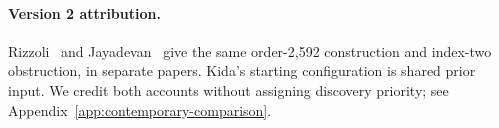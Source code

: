 
\paragraph{Version 2 attribution.}
Rizzoli~\cite{rizzoli-21-68} and Jayadevan~\cite{jayadevan-21-68}
give the same order-2,592 construction and index-two obstruction, in
separate papers. Kida's starting configuration is shared prior input.
We credit both accounts without assigning discovery priority; see
Appendix~\ref{app:contemporary-comparison}.
